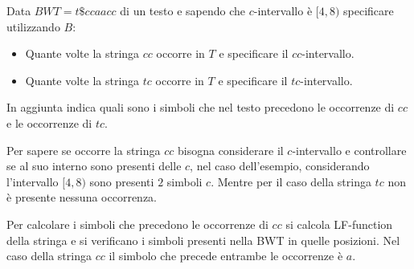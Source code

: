 \begin{esempio}
    Data $BWT =t\$ccaacc$ di un testo e sapendo che $c$-intervallo è $[4,8)$
        specificare utilizzando $B$:
        \begin{itemize}
            \item Quante volte la stringa $cc$ occorre in $T$ e specificare il
                  $cc$-intervallo.
            \item Quante volte la stringa $tc$ occorre in $T$ e specificare il
                  $tc$-intervallo.
        \end{itemize}
        In aggiunta indica quali sono i simboli che nel testo precedono le occorrenze
        di $cc$ e le occorrenze di $tc$.

        Per sapere se occorre la stringa $cc$ bisogna considerare il $c$-intervallo
        e controllare se al suo interno sono presenti delle $c$, nel caso
        dell'esempio, considerando l'intervallo $[4, 8)$ sono presenti $2$
        simboli $c$. Mentre per il caso della stringa $tc$ non è presente nessuna
        occorrenza.

        Per calcolare i simboli che precedono le occorrenze  di $cc$ si calcola
        LF-function della stringa e si verificano i simboli presenti nella BWT
        in quelle posizioni. Nel caso della stringa $cc$ il simbolo che precede
        entrambe le occorrenze è $a$.
\end{esempio}
